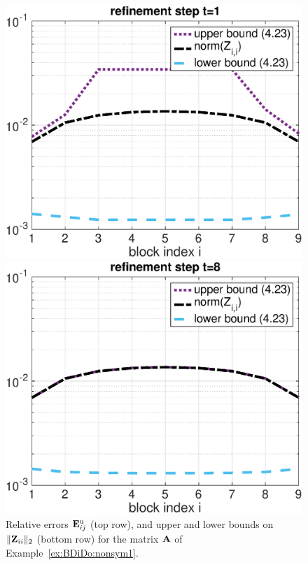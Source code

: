 \begin{example}
{\begin{figure}[h!]
\begin{minipage}[t]{0.48\linewidth}
\end{minipage}
\\%
\begin{minipage}[t]{0.48\linewidth}
\centering
\includegraphics[width=0.99\linewidth]{figures/9times9_Z2_Bounds_t1.eps}
\end{minipage}
%
\begin{minipage}[t]{0.48\linewidth}
\includegraphics[width=0.99\linewidth]{figures/9times9_Z2_Bounds_t8.eps}
\end{minipage}
\caption{Relative errors $\mathbf{E}^{\text{u}}_{ij}$ (top row), and upper and lower bounds on $\|\mathbf{Z}_{ii}\|_2$ (bottom row) for the matrix $\mathbf{A}$ of Example~\ref{ex:BDiDo:nonsym1}.}
\label{fig:BDiDo:ex:nonsym1}
\end{figure}
}\end{example}


